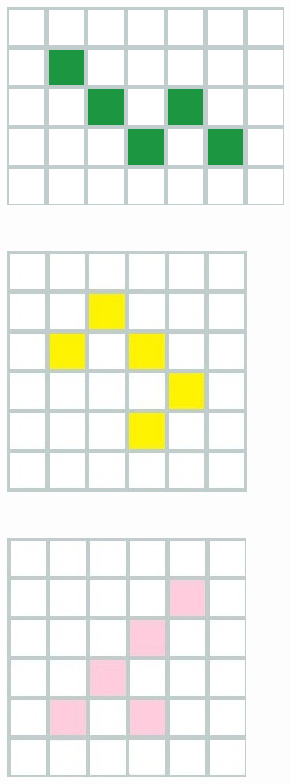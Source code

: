 \begin{figure}[h]
	
	\begin{minipage}{3.5cm}
		\centering
		\includegraphics[scale=0.30]{immagini/bigz}
		\caption{}
		\label{bigz}
	\end{minipage}
	\ \hspace{2mm} \hspace{3mm} \
	\begin{minipage}{3.5cm}
		\centering
		\includegraphics[scale=0.25]{immagini/yellow}
		\caption{}
		\label{c}
	\end{minipage}
	\ \hspace{2mm} \hspace{3mm} \
	\begin{minipage}{3.5cm}
		\centering
		\includegraphics[scale=0.25]{immagini/Y}
		\caption{}
		\label{y}
	\end{minipage}
\end{figure}

